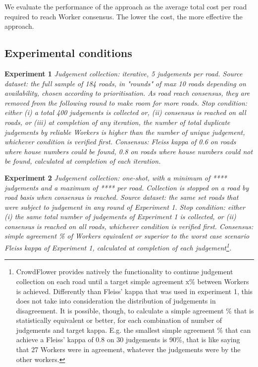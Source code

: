 We evaluate the performance of the approach as the average total cost per road required to reach Worker consensus. The lower the cost, the more effective the approach.

\subsection{Experimental conditions}

\textbf{Experiment 1} {\it Judgement collection: iterative, 5 judgements per road. Source dataset: the full sample of 184 roads, in "rounds" of max 10 roads depending on availability, chosen according to prioritisation. As road reach consensus, they are removed from the following round to make room for more roads. Stop condition: either (i) a total 400 judgements is collected or, (ii) consensus is reached on all roads, or (iii) at completion of any iteration, the number of total duplicate judgements by reliable Workers is higher than the number of unique judgement, whichever condition is verified first. Consensus: Fleiss kappa of 0.6 on roads where house numbers could be found, 0.8 on roads where house numbers could not be found, calculated at completion of each iteration.} 

\textbf{Experiment 2} {\it Judgement collection: one-shot, with a minimum of **** judgements and a maximum of **** per road. Collection is stopped on a road by road basis when consensus is reached. Source dataset: the same set roads that were subject to judgement in any round of Experiment 1. Stop condition: either (i) the same total number of judgements of Experiment 1 is collected, or (ii) consensus is reached on all roads, whichever condition is verified first. Consensus: simple agreement \% of Workers equivalent or superior to the worst case scenario Fleiss kappa of Experiment 1, calculated at completion of each judgement\footnote{CrowdFlower provides natively the functionality to continue judgement collection on each road until a target simple agreement x\% between Workers is achieved. Differently than Fleiss' kappa that was used in experiment 1, this does not take into consideration the distribution of judgements in disagreement. It is possible, though, to calculate a simple agreement \% that is statistically equivalent or better, for each combination of number of judgements and target kappa. E.g. the smallest simple agreement \% that can achieve a Fleiss' kappa of 0.8 on 30 judgements is 90\%, that is like saying that 27 Workers were in agreement, whatever the judgements were by the other workers.}.} 
